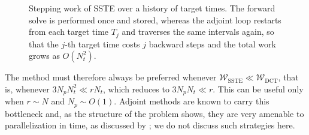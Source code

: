 \begin{figure}[t]
  \centering
  \caption{Stepping work of SSTE over a history of target times. The forward solve is performed
  once and stored, whereas the adjoint loop restarts from each target time \(T_j\) and traverses
  the same intervals again, so that the \(j\)-th target time costs \(j\) backward steps and the
  total work grows as \(O(N_t^{2})\).}
  \label{fig:sste_time_history_cost}
\end{figure}

The method must therefore always be preferred whenever
\(\mathcal{W}_{\mathrm{SSTE}}\ll\mathcal{W}_{\mathrm{DCT}}\), that is, whenever
\(3N_pN_t^{2}\ll rN_t\), which reduces to \(3N_pN_t\ll r\). This can be useful only when
\(r\sim N\) and \(N_p\sim O(1)\). Adjoint methods are known to carry this bottleneck and, as the
structure of the problem shows, they are very amenable to parallelization in time, as discussed by
\citet{skene-eggl-schmid-2021}; we do not discuss such strategies here.
